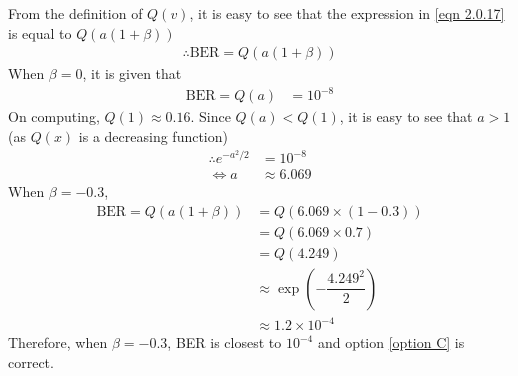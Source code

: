 \documentclass[journal,10pt,twocolumn]{IEEEtran}
\begin{document}
From the definition of $Q(v)$, it is easy to see that the expression in \ref{eqn 2.0.17} is equal to $Q(a(1+\beta))$
\begin{align}
\therefore \text{BER} = Q(a(1+\beta ))
\end{align}
When $\beta = 0$, it is given that 
\begin{align}
\text{BER} = Q(a) &= 10^{-8}
\end{align}
On computing, $Q(1) \approx 0.16$. Since $Q(a)<Q(1)$, it is easy to see that $a>1$ (as $Q(x)$ is a decreasing function)
\begin{align}
\therefore e^{-a^2 / 2} &= 10^{-8}\\
\Leftrightarrow a &\approx 6.069
\end{align}
When $\beta = -0.3$,
\begin{align}
\text{BER} = Q(a(1+\beta)) &= Q(6.069 \times (1-0.3))\\
&= Q(6.069 \times 0.7)\\
&= Q(4.249)\\
&\approx \exp (-\dfrac{4.249^2}{2})\\
&\approx 1.2 \times 10^{-4}
\end{align}
Therefore, when $\beta = -0.3$, BER is closest to $10^{-4}$ and option \ref{option C} is correct.
\end{document}
